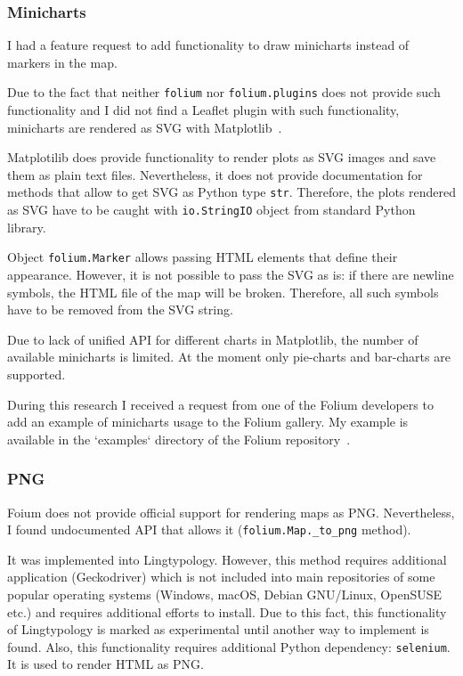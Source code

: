\documentclass[a4paper,12pt]{article}
\begin{document}
\subsubsection{Minicharts}

I had a feature request to add functionality to draw minicharts instead of markers in the map.

Due to the fact that neither \texttt{folium} nor \texttt{folium.plugins} does not provide such functionality and I did not find a Leaflet plugin with such functionality, minicharts are rendered as SVG with Matplotlib~\parencite{matplotlib}.

Matplotilib does provide functionality to render plots as SVG images and save them as plain text files. Nevertheless, it does not provide documentation for methods that allow to get SVG as Python type \texttt{str}. Therefore, the plots rendered as SVG have to be caught with \texttt{io.StringIO} object from standard Python library.

Object \texttt{folium.Marker} allows passing HTML elements that define their appearance. However, it is not possible to pass the SVG as is: if there are newline symbols, the HTML file of the map will be broken. Therefore, all such symbols have to be removed from the SVG string.

Due to lack of unified API for different charts in Matplotlib, the number of available minicharts is limited. At the moment only pie-charts and bar-charts are supported.

During this research I received a request from one of the Folium developers to add an example of minicharts usage to the Folium gallery. My example is available in the `examples` directory of the Folium repository~\parencite{folium}.

\subsubsection{PNG}

Foium does not provide official support for rendering maps as PNG. Nevertheless, I found undocumented API that allows it (\texttt{folium.Map.\_to\_png} method).

It was implemented into Lingtypology. However, this method requires additional application (Geckodriver) which is not included into main repositories of some popular operating systems (Windows, macOS, Debian GNU/Linux, OpenSUSE etc.) and requires additional efforts to install. Due to this fact, this functionality of Lingtypology is marked as experimental until another way to implement is found. Also, this functionality requires additional Python dependency: \texttt{selenium}. It is used to render HTML as PNG.
\end{document}
